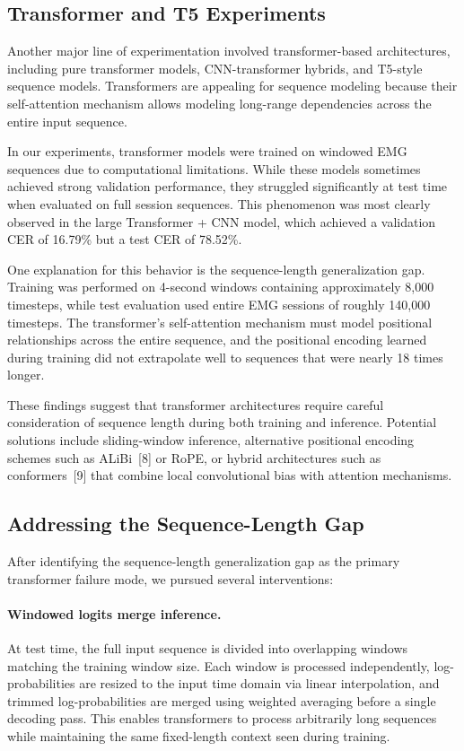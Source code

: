 \documentclass{article}
\begin{document}
\subsection{Transformer and T5 Experiments}

Another major line of experimentation involved transformer-based architectures, including pure transformer models, CNN-transformer hybrids, and T5-style sequence models. Transformers are appealing for sequence modeling because their self-attention mechanism allows modeling long-range dependencies across the entire input sequence.

In our experiments, transformer models were trained on windowed EMG sequences due to computational limitations. While these models sometimes achieved strong validation performance, they struggled significantly at test time when evaluated on full session sequences. This phenomenon was most clearly observed in the large Transformer + CNN model, which achieved a validation CER of 16.79\% but a test CER of 78.52\%.

One explanation for this behavior is the sequence-length generalization gap. Training was performed on 4-second windows containing approximately 8,000 timesteps, while test evaluation used entire EMG sessions of roughly 140,000 timesteps. The transformer's self-attention mechanism must model positional relationships across the entire sequence, and the positional encoding learned during training did not extrapolate well to sequences that were nearly 18 times longer.

These findings suggest that transformer architectures require careful consideration of sequence length during both training and inference. Potential solutions include sliding-window inference, alternative positional encoding schemes such as ALiBi~[8] or RoPE, or hybrid architectures such as conformers~[9] that combine local convolutional bias with attention mechanisms.

\subsection{Addressing the Sequence-Length Gap}

After identifying the sequence-length generalization gap as the primary transformer failure mode, we pursued several interventions:

\paragraph{Windowed logits merge inference.}
At test time, the full input sequence is divided into overlapping windows matching the training window size. Each window is processed independently, log-probabilities are resized to the input time domain via linear interpolation, and trimmed log-probabilities are merged using weighted averaging before a single decoding pass. This enables transformers to process arbitrarily long sequences while maintaining the same fixed-length context seen during training.
\end{document}
